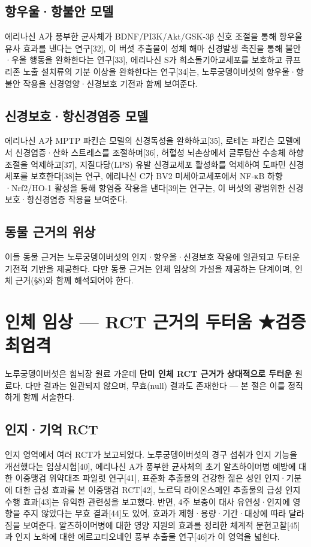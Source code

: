 \documentclass[11pt,oneside]{book}
\begin{document}
\subsection{항우울·항불안 모델}
에리나신 A가 풍부한 균사체가 BDNF/PI3K/Akt/GSK-3β 신호 조절을 통해 항우울 유사 효과를 낸다는 연구[32], 이 버섯 추출물이 성체 해마 신경발생 촉진을 통해 불안·우울 행동을 완화한다는 연구[33], 에리나신 S가 희소돌기아교세포를 보호하고 큐프리존 노출 설치류의 기분 이상을 완화한다는 연구[34]는, 노루궁뎅이버섯의 항우울·항불안 작용을 신경영양·신경보호 기전과 함께 보여준다.

\subsection{신경보호·항신경염증 모델}
에리나신 A가 MPTP 파킨슨 모델의 신경독성을 완화하고[35], 로테논 파킨슨 모델에서 신경염증·산화 스트레스를 조절하며[36], 허혈성 뇌손상에서 글루탐산 수송체 하향조절을 억제하고[37], 지질다당(LPS) 유발 신경교세포 활성화를 억제하여 도파민 신경세포를 보호한다[38]는 연구, 에리나신 C가 BV2 미세아교세포에서 NF-κB 하향·Nrf2/HO-1 활성을 통해 항염증 작용을 낸다[39]는 연구는, 이 버섯의 광범위한 신경보호·항신경염증 작용을 보여준다.

\subsection{동물 근거의 위상}
이들 동물 근거는 노루궁뎅이버섯의 인지·항우울·신경보호 작용에 일관되고 두터운 기전적 기반을 제공한다. 다만 동물 근거는 인체 임상의 가설을 제공하는 단계이며, 인체 근거(§8)와 함께 해석되어야 한다.

\section{인체 임상 — RCT 근거의 두터움 ★검증 최엄격}
노루궁뎅이버섯은 힘뇌장 원료 가운데 \textbf{단미 인체 RCT 근거가 상대적으로 두터운} 원료다. 다만 결과는 일관되지 않으며, 무효(null) 결과도 존재한다 — 본 절은 이를 정직하게 함께 서술한다.

\subsection{인지·기억 RCT}
인지 영역에서 여러 RCT가 보고되었다. 노루궁뎅이버섯의 경구 섭취가 인지 기능을 개선했다는 임상시험[40], 에리나신 A가 풍부한 균사체의 초기 알츠하이머병 예방에 대한 이중맹검 위약대조 파일럿 연구[41], 표준화 추출물의 건강한 젊은 성인 인지·기분에 대한 급성 효과를 본 이중맹검 RCT[42], 노르딕 라이온스메인 추출물의 급성 인지 수행 효과[43]는 유익한 관련성을 보고했다. 반면, 4주 보충이 대사 유연성·인지에 영향을 주지 않았다는 무효 결과[44]도 있어, 효과가 제형·용량·기간·대상에 따라 달라짐을 보여준다. 알츠하이머병에 대한 영양 지원의 효과를 정리한 체계적 문헌고찰[45]과 인지 노화에 대한 에르고티오네인 풍부 추출물 연구[46]가 이 영역을 넓힌다.
\end{document}
